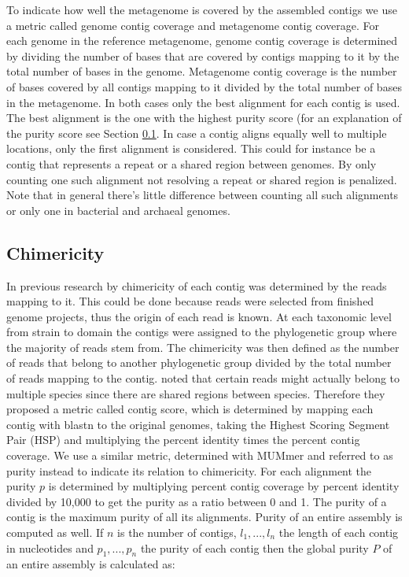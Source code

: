 \documentclass[a4paper,12pt]{report}
\begin{document}
To indicate how well the metagenome is covered by the assembled contigs we use
a metric called genome contig coverage and metagenome contig coverage. For each
genome in the reference metagenome, genome contig coverage is determined by
dividing the number of bases that are covered by contigs mapping to it by the
total number of bases in the genome. Metagenome contig coverage is the number
of bases covered by all contigs mapping to it divided by the total number of
bases in the metagenome. In both cases only the best alignment for each contig
is used. The best alignment is the one with the highest purity score (for an
explanation of the purity score see Section \ref{sec:chimer}. In case a contig
aligns equally well to multiple locations, only the first alignment is
considered. This could for instance be a contig that represents a repeat or a
shared region between genomes. By only counting one such alignment not
resolving a repeat or shared region is penalized. Note that in general there's
little difference between counting all such alignments or only one in bacterial
and archaeal genomes.


\subsection{Chimericity}
\label{sec:chimer}
In previous research by \citet{Mavromatis17468765} chimericity of
each contig was determined by the reads mapping to it. This could be done
because reads were selected from finished genome projects, thus 
the origin of each read is known. At each taxonomic level from strain to domain the
contigs were assigned to the phylogenetic group where the majority of reads
stem from. The chimericity was then defined as the number of
reads that belong to another phylogenetic group divided by the total number of
reads mapping to the contig.  \citet{Mende22384016} noted that certain
reads might actually belong to multiple species since there are shared regions between species.
Therefore they proposed a metric called contig score, which is determined by mapping
each contig with blastn to the original genomes, taking the Highest Scoring
Segment Pair (HSP) and multiplying the percent identity times the percent
contig coverage. We use a similar metric, determined with MUMmer
and referred to as purity instead to indicate its relation to chimericity. For
each alignment the purity $p$ is determined by multiplying percent contig
coverage by percent identity divided by 10,000 to get the purity as a ratio
between 0 and 1. The purity of a contig is the maximum purity of all its
alignments. Purity of an entire assembly is computed as well. If $n$ is the
number of contigs, $l_1,...,l_n$ the length of each contig in nucleotides and
$p_1,...,p_n$ the purity of each contig then the global purity $P$ of an entire
assembly is calculated as:
\end{document}
